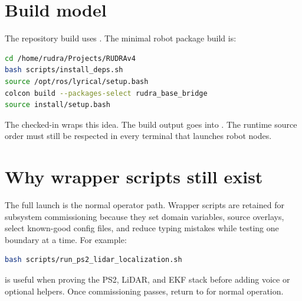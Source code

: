 \section{Build model}

The repository build uses . The minimal robot package build is:

\begin{lstlisting}[language=bash]
cd /home/rudra/Projects/RUDRAv4
bash scripts/install_deps.sh
source /opt/ros/lyrical/setup.bash
colcon build --packages-select rudra_base_bridge
source install/setup.bash
\end{lstlisting}

The checked-in  wraps this idea. The build output goes into . The runtime source order must still be respected in every terminal that launches robot nodes.

\section{Why wrapper scripts still exist}

The full launch is the normal operator path. Wrapper scripts are retained for subsystem commissioning because they set domain variables, source overlays, select known-good config files, and reduce typing mistakes while testing one boundary at a time. For example:

\begin{lstlisting}[language=bash]
bash scripts/run_ps2_lidar_localization.sh
\end{lstlisting}

is useful when proving the PS2, LiDAR, and EKF stack before adding voice or optional helpers. Once commissioning passes, return to  for normal operation.
